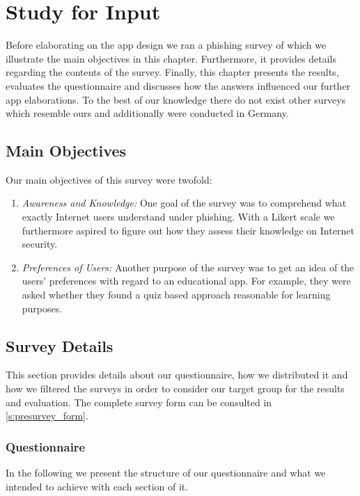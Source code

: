 \section{Study for Input}
\label{s:survey}
Before elaborating on the app design we ran a phishing survey of which we illustrate the main objectives in this chapter.
 Furthermore, it provides details regarding the contents of the survey.
Finally, this chapter presents the results, evaluates the questionnaire and discusses how the answers influenced our further app elaborations.
 To the best of our knowledge there do not exist other surveys which resemble ours and additionally were conducted in Germany.

\subsection{Main Objectives}
Our main objectives of this survey were twofold:

\begin{enumerate}
	\item \textit{Awareness and Knowledge:} One goal of the survey was to comprehend what exactly Internet users understand under phishing.
 With a Likert scale we furthermore aspired to figure out how they assess their knowledge on Internet security.

	\item \textit{Preferences of Users:} Another purpose of the survey was to get an idea of the users' preferences with regard to an educational app.
 For example, they were asked whether they found a quiz based approach reasonable for learning purposes.

\end{enumerate}
\subsection{Survey Details}
This section provides details about our questionnaire, how we distributed it and how we filtered the surveys in order to consider our target group for the results and evaluation.
The complete survey form can be consulted in \autoref{s:presurvey_form}.

\subsubsection{Questionnaire}
In the following we present the structure of our questionnaire and what we intended to achieve with each section of it.
 
